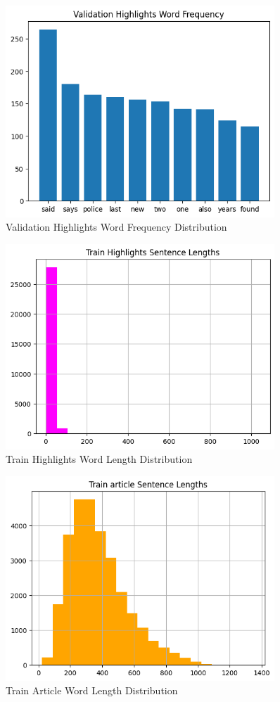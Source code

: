 \documentclass{article}
\begin{document}
\begin{figure}[h]
    \label{fig:word_freq_2}
    \centering
    \includegraphics[width=0.9\textwidth]{valf.png}
    \caption{Validation Highlights Word Frequency Distribution}
\end{figure}
\begin{figure}[h]
    \label{fig:word_freq_3}
    \centering
    \includegraphics[width=0.9\textwidth]{trainl.png}
    \caption{Train Highlights Word Length Distribution}
\end{figure}
\begin{figure}[h]
    \label{fig:word_freq_4}
    \centering
    \includegraphics[width=0.9\textwidth]{trainal.png}
    \caption{Train Article Word Length Distribution}
\end{figure}
\end{document}
